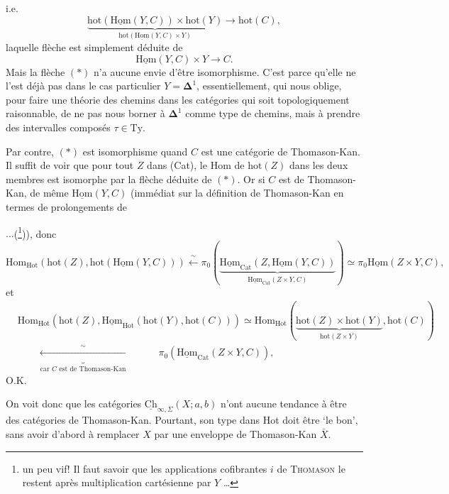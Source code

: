 \documentclass[11pt]{article}
\newcommand{\printedpage}[1]{\marginpar{\footnotesize p.~#1}}
\newcommand{\msp}[1]{\marginpar{\footnotesize [#1]}}
\newcommand{\uHom}{\underline{\mathrm{Hom}}}
\newcommand{\uCh}{\underline{\mathrm{Ch}}}
\newcommand{\hot}{\mathrm{hot}}
\begin{document}
\printedpage{84}

i.e.
\[
\underbrace{\hot(\uHom(Y,C))\times\hot(Y)}_{\hot(\uHom(Y,C)\times Y)}\longrightarrow\hot(C),
\]
laquelle flèche est simplement déduite de
\[
\uHom(Y,C)\times Y\longrightarrow C.
\]
Mais la flèche $(*)$ n'a aucune envie d'être isomorphisme. C'est parce qu'elle ne l'est déjà pas dans le cas particulier $Y=\mathbf{\Delta}^1$, essentiellement, qui nous oblige, pour faire une théorie des chemins dans les catégories qui soit topologiquement raisonnable, de ne pas nous borner à $\mathbf{\Delta}^1$ comme type de chemins, mais à prendre des intervalles composés $\tau\in\mathrm{Ty}$.

\msp{page 136}

Par contre, $(*)$ est isomorphisme quand $C$ est une catégorie de Thomason-Kan. Il suffit de voir que pour tout $Z$ dans (Cat), le Hom de $\hot(Z)$ dans les deux membres est isomorphe par la flèche déduite de $(*)$. Or si $C$ est de Thomason-Kan, de même $\uHom(Y,C)$ (immédiat sur la définition de Thomason-Kan en termes de prolongements de
$\ldots$(\footnote[29]{un peu vif! Il faut savoir que les applications cofibrantes $i$ de \textsc{Thomason} le restent après multiplication cartésienne par $Y$ \ldots})), donc
\[
\mathrm{Hom}_{\mathrm{Hot}}(\hot(Z),\hot(\uHom(Y,C)))\xleftarrow{\ \sim\ }\pi_0(\underbrace{\uHom_{\mathrm{Cat}}(Z,\uHom(Y,C))}_{\uHom_{\mathrm{Cat}}(Z\times Y,C)})\simeq\pi_0\uHom(Z\times Y,C), %
\]
et
\[
\begin{aligned}
&\mathrm{Hom}_{\mathrm{Hot}}(\hot(Z),\uHom_{\mathrm{Hot}}(\hot(Y),\hot(C)))\simeq\mathrm{Hom}_{\mathrm{Hot}}(\underbrace{\hot(Z)\times\hot(Y)}_{\hot(Z\times Y)},\hot(C))\\
&\qquad\underbrace{\xleftarrow{\ \sim\ }}_{\text{car $C$ est de Thomason-Kan}}\qquad\quad\pi_0(\uHom_{\mathrm{Cat}}(Z\times Y,C)),
\end{aligned}
\]
O.K.

On voit donc que les catégories $\uCh_{\infty,\Sigma}(X;a,b)$ n'ont aucune tendance à être des catégories de Thomason-Kan. Pourtant, son type dans Hot doit être `le bon', sans avoir d'abord à remplacer $X$ par une enveloppe de Thomason-Kan $\bar{X}$.

\printedpage{85}
\end{document}
